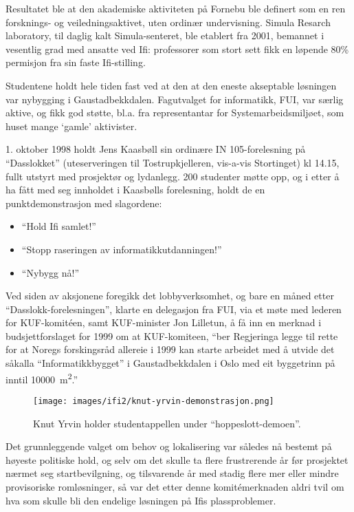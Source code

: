 Resultatet ble at den akademiske aktiviteten på Fornebu ble definert som en ren forsknings- og veiledningsaktivet, uten ordinær undervisning. Simula Resarch laboratory, til daglig kalt Simula-senteret, ble etablert fra 2001, bemannet i vesentlig grad med ansatte ved Ifi: professorer som stort sett fikk en løpende 80\% permisjon fra sin faste Ifi-stilling.

Studentene holdt hele tiden fast ved at den at den eneste akseptable løsningen var nybygging i Gaustadbekkdalen. Fagutvalget for informatikk, FUI, var særlig aktive, og fikk god støtte, bl.a. fra representantar for Systemarbeidsmiljøet, som huset mange `gamle' aktivister.

1. oktober 1998 holdt Jens Kaasbøll sin ordinære IN 105-forelesning på ``Dasslokket'' (uteserveringen til Tostrupkjelleren, vis-a-vis Stortinget) kl 14.15, fullt utstyrt med prosjektør og lydanlegg. 200 studenter møtte opp, og i etter å ha fått med seg innholdet i Kaasbølls forelesning, holdt de en punktdemonstrasjon med slagordene:

\begin{itemize}
	\item ``Hold Ifi samlet!''
	\item ``Stopp raseringen av informatikkutdanningen!''
	\item ``Nybygg nå!''
\end{itemize}

Ved siden av aksjonene foregikk det lobbyverksomhet, og bare en måned etter ``Dasslokk-forelesningen'', klarte en delegasjon fra FUI, via et møte med lederen for KUF-komitéen, samt KUF-minister Jon Lilletun, å få inn en merknad i budsjettforslaget for 1999 om at KUF-komiteen, ``ber Regjeringa legge til rette for at Noregs forskingsråd allereie i 1999 kan starte arbeidet med å utvide det såkalla ``Informatikkbygget'' i Gaustadbekkdalen i Oslo med eit byggetrinn på inntil \SI{10 000}{\metre\squared}.''

\begin{wrapfigure}{l}{8cm}
\centering
\texttt{[image: images/ifi2/knut-yrvin-demonstrasjon.png]}
	\caption{Knut Yrvin holder studentappellen under ``hoppeslott-demoen''.}
\end{wrapfigure}

Det grunnleggende valget om behov og lokalisering var således nå bestemt på høyeste politiske hold, og selv om det skulle ta flere frustrerende år før prosjektet nærmet seg startbevilgning, og tilsvarende år med stadig flere mer eller mindre provisoriske romløsninger, så var det etter denne komitémerknaden aldri tvil om hva som skulle bli den endelige løsningen på Ifis plassproblemer.

